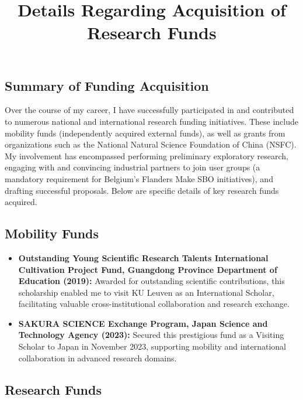 \documentclass[9pt,a4paper]{article}
\author{ }
\begin{document}
\title {Details Regarding Acquisition of Research Funds}
\date{}
\maketitle

\subsection*{Summary of Funding Acquisition}

Over the course of my career, I have successfully participated in and contributed to numerous national and international research funding initiatives. These include mobility funds (independently acquired external funds), as well as grants from organizations such as the National Natural Science Foundation of China (NSFC). My involvement has encompassed performing preliminary exploratory research, engaging with and convincing industrial partners to join user groups (a mandatory requirement for Belgium’s Flanders Make SBO initiatives), and drafting successful proposals. Below are specific details of key research funds acquired.

\subsection*{Mobility Funds}

\begin{itemize}
    \item \textbf{Outstanding Young Scientific Research Talents International Cultivation Project Fund, Guangdong Province Department of Education (2019):}  
    Awarded for outstanding scientific contributions, this scholarship enabled me to visit KU Leuven as an International Scholar, facilitating valuable cross-institutional collaboration and research exchange.

    \item \textbf{SAKURA SCIENCE Exchange Program, Japan Science and Technology Agency (2023):}  
    Secured this prestigious fund as a Visiting Scholar to Japan in November 2023, supporting mobility and international collaboration in advanced research domains.
\end{itemize}

\subsection*{Research Funds}
\end{document}
